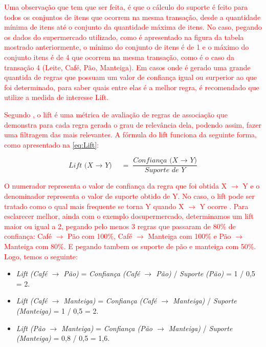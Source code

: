 \par
\textcolor{red}{Uma observação que tem que ser feita, é que o cálculo do suporte é feito para todos os conjuntos de itens que ocorrem na mesma transação, desde a quantidade mínima de itens até o conjunto da quantidade máxima de itens. No caso, pegando os dados do supermercado utilizado, como é apresentado na figura da tabela mostrado anteriormente, o mínimo do conjunto de itens é de 1 e o máximo do conjunto itens é de 4 que ocorrem na mesma transação, como é o caso da transação 4 (Leite, Café, Pão, Manteiga). Em casos onde é gerado uma grande quantida de regras que possuam um valor de confiança igual ou surperior ao que foi determinado, para saber quais entre elas é a melhor regra, é recomendado que utilize a medida de interesse Lift.}

\par
\textcolor{red}{Segundo , o lift é uma métrica de avaliação de regras de associação que demonstra para cada regra gerada o grau de relevância dela, podendo assim, fazer uma filtragem das mais relevantes. A fórmula do lift funciona da seguinte forma, como apresentado na \autoref{eq:Lift}:}

\begin{equation}
    \label{eq:Lift}
        {\textit{Lift (X $\rightarrow$ Y)}\quad =\frac { \textit{Confiança (X $\rightarrow$ Y)} }{ \textit{Suporte de Y}} }
\end{equation}

\par
\textcolor{red}{O numerador representa o valor de confiança da regra que foi obtida X $\rightarrow$ Y e o denominador representa o valor de suporte obtido de Y. No caso, o lift pode ser tratado como o qual mais frequente se torna Y quando X $\rightarrow$ Y ocorre \cite{Gonsalves2004}. Para esclarecer melhor, ainda com o exemplo dosupermercado, determinamos um lift maior ou igual a 2, pegando pelo menos 3 regras que passaram de 80\% de confiança: Café $\rightarrow$ Pão com 100\%, Café $\rightarrow$ Manteiga com 100\% e Pão $\rightarrow$ Manteiga com 80\%. E pegando tambem os suporte de pão e manteiga com 50\%. Logo, temos o seguinte:}

\begin{itemize}

    \item \textit{Lift (Café $\rightarrow$ Pão)} = \textit{Confiança (Café $\rightarrow$ Pão)} /  \textit{Suporte (Pão)} = 1 / 0,5 = 2.
    
    \item \textit{Lift (Café $\rightarrow$ Manteiga)} = \textit{Confiança (Café $\rightarrow$ Manteiga)} /  \textit{Suporte (Manteiga)} = 1 / 0,5 = 2.
    
    \item \textit{Lift (Pão $\rightarrow$ Manteiga)} = \textit{Confiança (Pão $\rightarrow$ Manteiga)} /  \textit{Suporte (Manteiga)} = 0,8 / 0,5 = 1,6.
    
\end{itemize}

